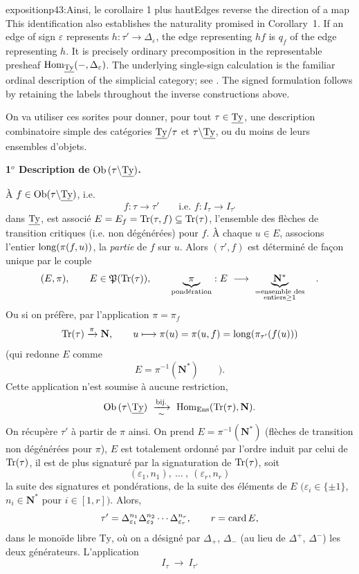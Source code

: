 \begin{dcomment}{exposition}{p43:Ainsi, le corollaire 1 plus haut}{Edges reverse the direction of a map}
This identification also establishes the naturality promised in Corollary~1. If an edge of sign $\varepsilon$ represents $h:\tau'\to\Delta_\varepsilon$, the edge representing $hf$ is $q_f$ of the edge representing $h$. It is precisely ordinary precomposition in the representable presheaf $\mathrm{Hom}_{\underline{\mathrm{Ty}}}(-,\Delta_\varepsilon)$. The underlying single-sign calculation is the familiar ordinal description of the simplicial category; see \citet[Appendix~D.1, pp.~713--715]{AguiarMahajan2010}. The signed formulation follows by retaining the labels throughout the inverse constructions above.
\end{dcomment}


On va utiliser ces sorites pour donner, pour tout $\tau \in \underline{\mathrm{Ty}}$, une description combinatoire simple des catégories $\underline{\mathrm{Ty}}/\tau$ et $\tau\backslash\underline{\mathrm{Ty}}$, ou du moins de leurs ensembles d'objets.

\textbf{1$^o$ Description de} $\operatorname{Ob}\,(\tau\backslash\underline{\mathrm{Ty}})$\textbf{.}

À $f \in \operatorname{Ob}(\tau\backslash\underline{\mathrm{Ty}})$, i.e.
\[
f : \tau \longrightarrow \tau' \qquad \text{i.e. } f : I_\tau \longrightarrow I_{\tau'}
\]
dans $\underline{\mathrm{Ty}}$, est associé $E = E_f = \mathrm{Tr}(\tau, f) \subseteq \mathrm{Tr}(\tau)$, l'ensemble des flèches de transition critiques (i.e. non dégénérées) pour $f$. À chaque $u \in E$, associons l'entier $\operatorname{long}(\pi(f, u))$,
la \textit{partie} de $f$ sur $u$. Alors $(\tau', f)$ est déterminé de façon unique par le couple
\[
(E, \pi), \qquad E \in \mathfrak{P}(\Tr(\tau)), \qquad \underbrace{\pi}_{\text{pondération}} : E \ \longrightarrow\ \underbrace{\mathbf{N}^*}_{\substack{= \text{ensemble des} \\ \text{entiers} \geq 1}} \quad .
\]
Ou si on préfère, par l'application $\pi = \pi_f$
\[
\mathrm{Tr}(\tau) \xrightarrow{\pi} \mathbf{N}, \qquad u \longmapsto \pi(u) = \pi(u, f) = \operatorname{long}(\pi_{\tau'}(f(u)))
\]
(qui redonne $E$ comme
\[
E = \pi^{-1}(\mathbf{N}^*) \qquad ).
\]
Cette application n'est soumise à aucune restriction,
\[
\Ob\,(\tau\backslash\uTy) \ \xrightarrow[\sim]{\text{bij.}}\ \Hom_{\mathrm{Ens}}(\Tr(\tau), \mathbf{N}).
\]
On récupère $\tau'$ à partir de $\pi$ ainsi. On prend $E = \pi^{-1}(\mathbf{N}^*)$ (flèches de transition non dégénérées pour $\pi$), $E$ est totalement ordonné par l'ordre induit par celui de $\mathrm{Tr}(\tau)$, il est de plus signaturé par la signaturation de $\mathrm{Tr}(\tau)$, soit
\[
(\varepsilon_1, n_1),\ \dots\ ,\ (\varepsilon_r, n_r)
\]
la suite des signatures et pondérations, de la suite des éléments de $E$ $(\varepsilon_i \in \{\pm 1\}$, $n_i \in \mathbf{N}^*$ pour $i \in [1, r])$. Alors,
\[
\tau' = \Delta_{\varepsilon_1}^{n_1} \Delta_{\varepsilon_2}^{n_2} \cdots \Delta_{\varepsilon_r}^{n_r}, \qquad r = \operatorname{card} E,
\]
dans le monoïde libre $\mathrm{Ty}$, où on a désigné par $\Delta_+$, $\Delta_-$ (au lieu de $\Delta^+$, $\Delta^-$) les deux générateurs. L'application
\[
I_\tau \ \longrightarrow\ I_{\tau'}
\]

